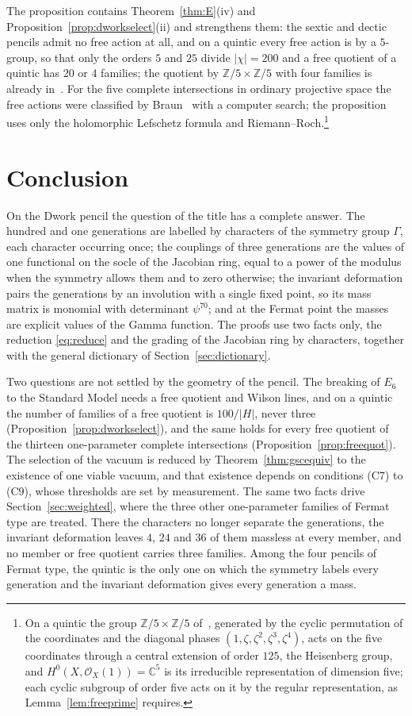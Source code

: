 \documentclass[11pt]{amsart}
\theoremstyle{definition}
\theoremstyle{remark}
\newcommand{\Z}{\mathbb{Z}}
\newcommand{\C}{\mathbb{C}}
\newcommand{\cO}{\mathcal{O}}
\begin{document}
The proposition contains Theorem~\ref{thm:E}(iv) and
Proposition~\ref{prop:dworkselect}(ii) and strengthens them: the sextic and
dectic pencils admit no free action at all, and on a quintic every free
action is by a $5$-group, so that only the orders $5$ and $25$ divide
$|\chi|=200$ and a free quotient of a quintic has $20$ or $4$ families;
the quotient by $\Z/5\times\Z/5$ with four families is already
in~\cite{CHSW85}. For the five complete intersections in ordinary
projective space the free actions were classified by Braun~\cite{Bra11}
with a computer search; the proposition uses only the holomorphic
Lefschetz formula and Riemann--Roch.\footnote{On a quintic the group
$\Z/5\times\Z/5$ of~\cite{CHSW85}, generated by the cyclic permutation of
the coordinates and the diagonal phases $(1,\zeta,\zeta^2,\zeta^3,\zeta^4)$,
acts on the five coordinates through a central extension of order $125$,
the Heisenberg group, and $H^0(X,\cO_X(1))=\C^5$ is its irreducible
representation of dimension five; each cyclic subgroup of order five acts on
it by the regular representation, as Lemma~\ref{lem:freeprime} requires.}

\section{Conclusion}\label{sec:conclusion}

On the Dwork pencil the question of the title has a complete answer. The
hundred and one generations are labelled by characters of the symmetry
group $\Gamma$, each character occurring once; the couplings of three
generations are the values of one functional on the socle of the Jacobian
ring, equal to a power of the modulus when the symmetry allows them and to
zero otherwise; the invariant deformation pairs the generations by an
involution with a single fixed point, so its mass matrix is monomial with
determinant $\psi^{70}$; and at the Fermat point the masses are explicit
values of the Gamma function. The proofs use two facts only, the reduction
\eqref{eq:reduce} and the grading of the Jacobian ring by characters,
together with the general dictionary of Section~\ref{sec:dictionary}.

Two questions are not settled by the geometry of the pencil. The breaking
of $E_6$ to the Standard Model needs a free quotient and Wilson lines, and
on a quintic the number of families of a free quotient is $100/|H|$, never
three (Proposition~\ref{prop:dworkselect}), and the same holds for every
free quotient of the thirteen one-parameter complete intersections
(Proposition~\ref{prop:freequot}). The selection of the vacuum is
reduced by Theorem~\ref{thm:gscequiv} to the existence of one viable vacuum,
and that existence depends on conditions (C7) to (C9), whose thresholds are
set by measurement. The same two facts drive Section~\ref{sec:weighted},
where the three other one-parameter families of Fermat type are treated.
There the characters no longer separate the generations, the invariant
deformation leaves $4$, $24$ and $36$ of them massless at every member, and
no member or free quotient carries three families. Among the four pencils
of Fermat type, the quintic is the only one on which the symmetry labels
every generation and the invariant deformation gives every generation a
mass.
\end{document}
